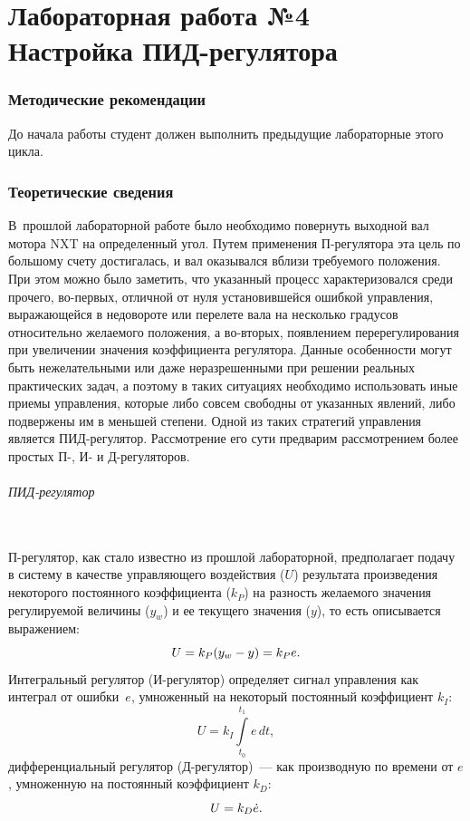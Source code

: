 \documentclass[12pt,a4paper,openany]{extarticle}
\begin{document}
\part*{Лабораторная работа №4\\
Настройка ПИД-регулятора}

\section{Методические рекомендации}
\hspace*{\parindent}До начала работы студент должен выполнить предыдущие лабораторные этого цикла.

\section{Теоретические сведения}
\hspace*{\parindent}В~прошлой лабораторной работе было необходимо повернуть выходной вал мотора NXT на  определенный угол.
Путем применения П-регулятора эта цель по большому счету достигалась, и вал оказывался вблизи требуемого положения. 
При этом можно было заметить, что указанный процесс характеризовался среди прочего, во-первых, отличной от нуля установившейся ошибкой управления, выражающейся в недовороте или перелете вала на несколько градусов относительно желаемого положения, а во-вторых, появлением перерегулирования при увеличении значения коэффициента регулятора. 
Данные особенности могут быть нежелательными или даже неразрешенными при решении реальных практических задач, а поэтому в таких ситуациях необходимо использовать иные приемы управления, которые либо совсем свободны от указанных явлений, либо подвержены им в меньшей степени. Одной из таких стратегий управления является ПИД-регулятор.
Рассмотрение его сути предварим рассмотрением более простых П-, И- и Д-регуляторов.

\paragraph*{ПИД-регулятор}$\phantom{-}$\\
\hspace*{\parindent}П-регулятор, как стало известно из прошлой лабораторной, предполагает подачу в систему в качестве управляющего воздействия ($U$) результата произведения некоторого постоянного коэффициента ($k_P$) на разность желаемого значения регулируемой величины ($y_w$) и ее текущего значения ($y$), то есть описывается выражением:
\begin{equation}
U = k_P(y_w - y) = k_P e\ldotp
\end{equation}
Интегральный регулятор (И-регулятор) определяет сигнал управления как интеграл от ошибки~$e$, умноженный на некоторый постоянный коэффициент $k_I$:
\begin{equation}
U = k_I\int\limits_{t_0}^{t_1} \!e\,dt,
\end{equation} 
дифференциальный регулятор (Д-регулятор)~--- как производную по времени от $e$, умноженную на постоянный коэффициент $k_D$:
\begin{equation}\label{eq:definiton_of_D_regulator}
U = k_D\dot{e}\ldotp
\end{equation}
\end{document}
